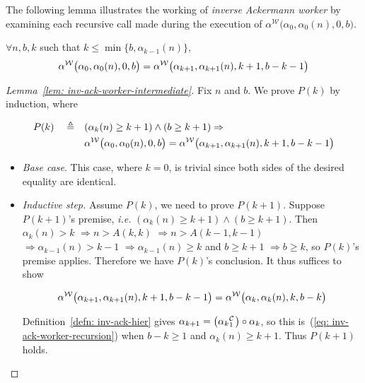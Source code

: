 The following lemma illustrates the working of \emph{inverse Ackermann worker} by examining each recursive call made during the execution of $\alpha^{\mathcal{W}}\big(\alpha_0, \alpha_0(n), 0, b\big)$.

\begin{lem} \label{lem: inv-ack-worker-intermediate}
	$\forall n, b, k$ such that $k\le \min\big\{b, \alpha_{k-1}(n)\big\}$,
	\begin{equation*}
	\alpha^{\mathcal{W}}\big(\alpha_0, \alpha_0(n), 0, b\big) = \alpha^{\mathcal{W}}\big(\alpha_{k+1}, \alpha_{k+1}(n), k+1, b-k-1\big)
	\end{equation*}
\end{lem}

\begin{proof}[Lemma~\ref{lem: inv-ack-worker-intermediate}]
	Fix $n$ and $b$. We prove $P(k)$ by induction, where
	
	\begin{equation*}
	\begin{aligned}
	P(k) \quad \triangleq \quad & (\alpha_k(n)\ge k+1) \wedge (b\ge k+1) \implies \null \\ & \alpha^{\W}\big(\alpha_0, \alpha_0(n), 0, b\big) = \alpha^{\W}\big(\alpha_{k+1}, \alpha_{k+1}(n), k+1, b-k-1\big)
	\end{aligned}
	\end{equation*}
	
	\begin{itemize}[leftmargin=*]
		\item \emph{Base case}. This case, where $k = 0$, is trivial since both sides of the desired equality are identical.
		
		\item \emph{Inductive step.} Assume $P(k)$, we need to prove $P(k+1)$. Suppose $P(k+1)$'s premise, \emph{i.e.} $(\alpha_k(n)\ge k+1) \wedge (b\ge k+1)$. Then $\alpha_k(n) > k$ $\Rightarrow n > A(k, k)$ $\Rightarrow n > A(k-1, k-1)$ $\Rightarrow \alpha_{k-1}(n) > k - 1$ $\Rightarrow \alpha_{k-1}(n)\ge k$ and $b\ge k+1$ $\Rightarrow b\ge k$, so $P(k)$'s premise applies. Therefore we have $P(k)$'s conclusion. It thus suffices to show
		
		\begin{equation*}
		\alpha^{\mathcal{W}}\big(\alpha_{k+1}, \alpha_{k+1}(n), k+1, b-k-1\big)
		= \alpha^{\mathcal{W}}\big(\alpha_k, \alpha_k(n), k, b-k\big)
		\end{equation*}
		
		Definition~\ref{defn: inv-ack-hier} gives $\alpha_{k+1} = \big(\cdt{\alpha_k}{1}\big)\circ \alpha_k$, so this
		is~(\ref{eq: inv-ack-worker-recursion}) when $b - k\ge 1$ and $\alpha_k(n)\ge k+1$. Thus $P(k+1)$ holds.
	\end{itemize}
\end{proof}


